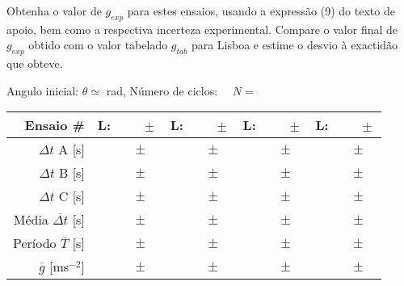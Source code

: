 \documentclass[a4paper,12pt]{article}      %
\begin{document}
Obtenha o valor de $g_{exp}$ para estes ensaios, usando a expressão (9) do texto de apoio, bem como a respectiva incerteza experimental. Compare o valor final de $g_{exp}$ obtido com o valor tabelado $g_{tab}$ para Lisboa e estime o desvio à exactidão que obteve. 

\begin{center}
\begin{small}
	\noindent Angulo inicial:	$\theta \simeq$ \underline{\makebox[1.5cm][r]{~}} rad,  Número de ciclos: $\quad N=$\underline{\makebox[1cm][r]{~}} \\
\bigskip
\begin{tabular}{|r|c|c|c|c|}
\hline
Ensaio  \# & L: $\qquad \pm$ \qquad [m] & L: $\qquad \pm$ \qquad[m] & L: $\qquad \pm$ \qquad[m] & L: $\qquad \pm$ \qquad[m]\\
\hline \hline
$\Delta t$ A  [s]&  $\qquad \pm$ \quad &  $\qquad \pm$ \quad&  $\qquad \pm$ \quad&  $\qquad \pm$ \quad\\ \hline
$\Delta t$ B  [s]&  $\qquad \pm$ \quad &  $\qquad \pm$ \quad&  $\qquad \pm$ \quad&  $\qquad \pm$ \quad\\ \hline
$\Delta t$ C  [s]&  $\qquad \pm$ \quad &  $\qquad \pm$ \quad&  $\qquad \pm$ \quad&  $\qquad \pm$ \quad\\ \hline
\hline 
Média $\overline{\Delta t}$ [s] & $\qquad \pm$ \quad  & $\qquad \pm$ \quad  &  $\qquad \pm$ \quad  & $\qquad \pm$ \quad \\
Período $\overline{T}$ [s] & $\qquad \pm$ \quad  & $\qquad \pm$ \quad  &  $\qquad \pm$ \quad  &  $\qquad \pm$ \quad  \\
 $\overline{g}$ [ms$^{-2}$] & $\qquad \pm$ \quad  & $\qquad \pm$ \quad  & $\qquad \pm$ \quad & $\qquad \pm$ \quad \\
\hline

\end{tabular}
\end{small}
\end{center}
\end{document}
